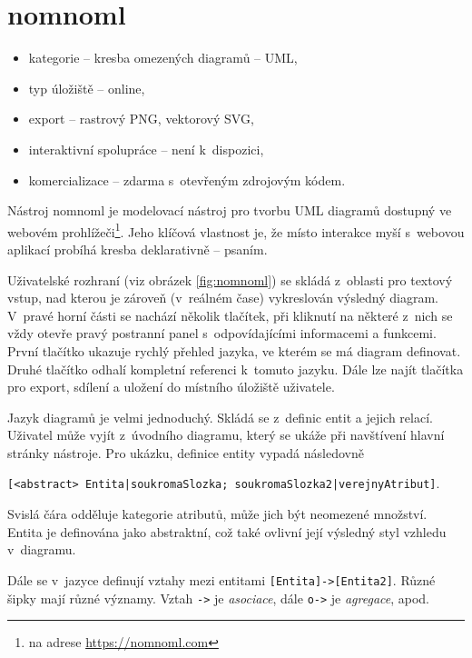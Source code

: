 \section{nomnoml}

\begin{itemize}
  \item kategorie -- kresba omezených diagramů -- UML,
  \item typ úložiště -- online,
  \item export -- rastrový PNG, vektorový SVG,
  \item interaktivní spolupráce -- není k~dispozici,
  \item komercializace -- zdarma s~otevřeným zdrojovým kódem.
\end{itemize}

Nástroj nomnoml je modelovací nástroj pro tvorbu UML diagramů dostupný ve
webovém prohlížeči\footnote{na adrese \url{https://nomnoml.com}}. Jeho klíčová
vlastnost je, že místo interakce myší s~webovou aplikací probíhá kresba
deklarativně -- psaním.

Uživatelské rozhraní (viz obrázek \ref{fig:nomnoml}) se skládá z~oblasti pro
textový vstup, nad kterou je zároveň (v~reálném čase) vykreslován výsledný
diagram. V~pravé horní části se nachází několik tlačítek, při kliknutí na
některé z~nich se vždy otevře pravý postranní panel s~odpovídajícími informacemi
a funkcemi. První tlačítko ukazuje rychlý přehled jazyka, ve kterém se má
diagram definovat. Druhé tlačítko odhalí kompletní referenci k~tomuto jazyku.
Dále lze najít tlačítka pro export, sdílení a uložení do místního úložiště
uživatele.

Jazyk diagramů je velmi jednoduchý. Skládá se z~definic entit a jejich relací.
Uživatel může vyjít z~úvodního diagramu, který se ukáže při navštívení hlavní
stránky nástroje. Pro ukázku, definice entity vypadá následovně

\noindent\texttt{[<abstract> Entita|soukromaSlozka; soukromaSlozka2|verejnyAtribut]}.

Svislá čára odděluje kategorie atributů, může jich být neomezené množství.
Entita je definována jako abstraktní, což také ovlivní její výsledný styl
vzhledu v~diagramu.

Dále se v~jazyce definují vztahy mezi entitami
\texttt{[Entita]->[Entita2]}. Různé šipky mají různé významy. Vztah \texttt{->}
je \emph{asociace}, dále \texttt{o->} je \emph{agregace}, apod.

